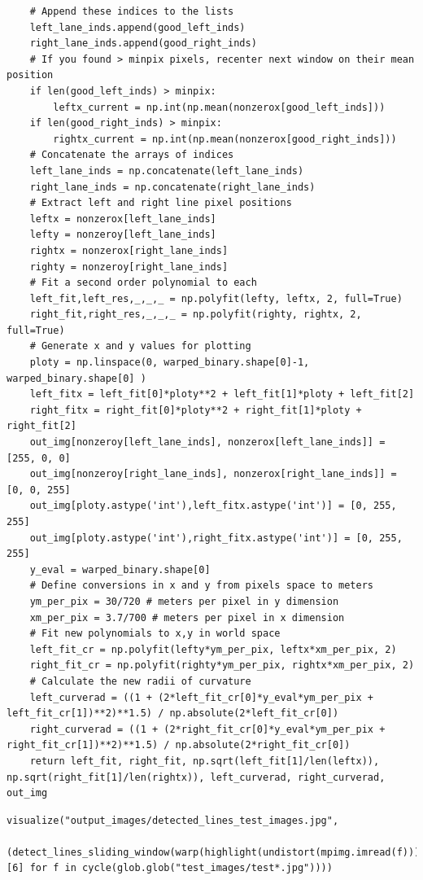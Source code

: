 \documentclass[11pt]{article}
\begin{document}
\begin{verbatim}
	# Append these indices to the lists
	left_lane_inds.append(good_left_inds)
	right_lane_inds.append(good_right_inds)
	# If you found > minpix pixels, recenter next window on their mean position
	if len(good_left_inds) > minpix:
	    leftx_current = np.int(np.mean(nonzerox[good_left_inds]))
	if len(good_right_inds) > minpix:        
	    rightx_current = np.int(np.mean(nonzerox[good_right_inds]))
    # Concatenate the arrays of indices
    left_lane_inds = np.concatenate(left_lane_inds)
    right_lane_inds = np.concatenate(right_lane_inds)
    # Extract left and right line pixel positions
    leftx = nonzerox[left_lane_inds]
    lefty = nonzeroy[left_lane_inds] 
    rightx = nonzerox[right_lane_inds]
    righty = nonzeroy[right_lane_inds] 
    # Fit a second order polynomial to each
    left_fit,left_res,_,_,_ = np.polyfit(lefty, leftx, 2, full=True)
    right_fit,right_res,_,_,_ = np.polyfit(righty, rightx, 2, full=True)
    # Generate x and y values for plotting
    ploty = np.linspace(0, warped_binary.shape[0]-1, warped_binary.shape[0] )
    left_fitx = left_fit[0]*ploty**2 + left_fit[1]*ploty + left_fit[2]
    right_fitx = right_fit[0]*ploty**2 + right_fit[1]*ploty + right_fit[2]
    out_img[nonzeroy[left_lane_inds], nonzerox[left_lane_inds]] = [255, 0, 0]
    out_img[nonzeroy[right_lane_inds], nonzerox[right_lane_inds]] = [0, 0, 255]
    out_img[ploty.astype('int'),left_fitx.astype('int')] = [0, 255, 255]
    out_img[ploty.astype('int'),right_fitx.astype('int')] = [0, 255, 255]
    y_eval = warped_binary.shape[0]
    # Define conversions in x and y from pixels space to meters
    ym_per_pix = 30/720 # meters per pixel in y dimension
    xm_per_pix = 3.7/700 # meters per pixel in x dimension
    # Fit new polynomials to x,y in world space
    left_fit_cr = np.polyfit(lefty*ym_per_pix, leftx*xm_per_pix, 2)
    right_fit_cr = np.polyfit(righty*ym_per_pix, rightx*xm_per_pix, 2)
    # Calculate the new radii of curvature
    left_curverad = ((1 + (2*left_fit_cr[0]*y_eval*ym_per_pix + left_fit_cr[1])**2)**1.5) / np.absolute(2*left_fit_cr[0])
    right_curverad = ((1 + (2*right_fit_cr[0]*y_eval*ym_per_pix + right_fit_cr[1])**2)**1.5) / np.absolute(2*right_fit_cr[0])
    return left_fit, right_fit, np.sqrt(left_fit[1]/len(leftx)), np.sqrt(right_fit[1]/len(rightx)), left_curverad, right_curverad, out_img
\end{verbatim}

\begin{verbatim}
visualize("output_images/detected_lines_test_images.jpg",
	  (detect_lines_sliding_window(warp(highlight(undistort(mpimg.imread(f)))))[6] for f in cycle(glob.glob("test_images/test*.jpg"))))
\end{verbatim}
\end{document}
